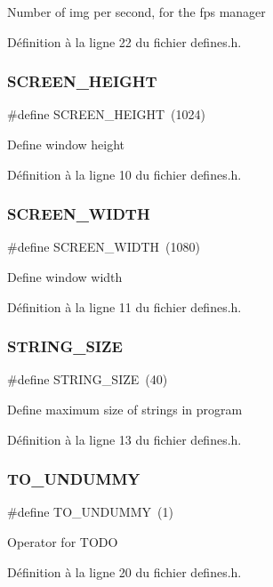 Number of img per second, for the fps manager 

Définition à la ligne 22 du fichier defines.\+h.

\mbox{\label{defines_8h_a6974d08a74da681b3957b2fead2608b8}} 
\subsubsection{S\+C\+R\+E\+E\+N\+\_\+\+H\+E\+I\+G\+HT}
{\footnotesize\ttfamily \#define S\+C\+R\+E\+E\+N\+\_\+\+H\+E\+I\+G\+HT~(1024)}

Define window height 

Définition à la ligne 10 du fichier defines.\+h.

\mbox{\label{defines_8h_a2cd109632a6dcccaa80b43561b1ab700}} 
\subsubsection{S\+C\+R\+E\+E\+N\+\_\+\+W\+I\+D\+TH}
{\footnotesize\ttfamily \#define S\+C\+R\+E\+E\+N\+\_\+\+W\+I\+D\+TH~(1080)}

Define window width 

Définition à la ligne 11 du fichier defines.\+h.

\mbox{\label{defines_8h_ad78224efe1d3fb39b67ca74ad9d9eec7}} 
\subsubsection{S\+T\+R\+I\+N\+G\+\_\+\+S\+I\+ZE}
{\footnotesize\ttfamily \#define S\+T\+R\+I\+N\+G\+\_\+\+S\+I\+ZE~(40)}

Define maximum size of strings in program 

Définition à la ligne 13 du fichier defines.\+h.

\mbox{\label{defines_8h_a7d95136fd756fcc08e4b94f27aa6e749}} 
\subsubsection{T\+O\+\_\+\+U\+N\+D\+U\+M\+MY}
{\footnotesize\ttfamily \#define T\+O\+\_\+\+U\+N\+D\+U\+M\+MY~(1)}

Operator for T\+O\+DO 

Définition à la ligne 20 du fichier defines.\+h.

